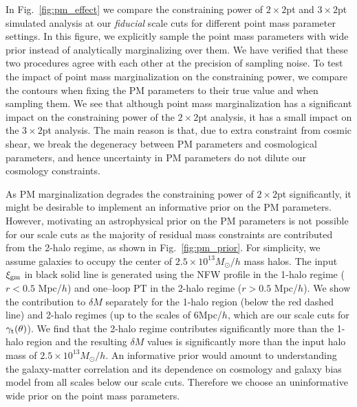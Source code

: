 \documentclass[aps, prd,twocolumn,superscriptaddress,nofootinbib,preprintnumbers]{revtex4-1}
\newcommand{\gammat}{\ensuremath{\gamma_{\rm t}(\theta)}}
\begin{document}
In Fig.~\ref{fig:pm_effect} we compare the constraining power of $2\times2$pt and $3\times2$pt simulated analysis at our \textit{fiducial} scale cuts for different point mass parameter settings. In this figure, we explicitly sample the point mass parameters with wide prior instead of analytically marginalizing over them. We have verified that these two procedures agree with each other at the precision of sampling noise. To test the impact of point mass marginalization on the constraining power, we compare the contours when fixing the PM parameters to their true value and when sampling them. We see that although point mass marginalization has a significant impact on the constraining power of the $2\times2$pt analysis, it has a small impact on the $3\times2$pt analysis. The main reason is that, due to extra constraint from cosmic shear, we break the degeneracy between PM parameters and cosmological parameters, and hence uncertainty in PM parameters do not dilute our cosmology constraints. 


As PM marginalization degrades the constraining power of $2\times2$pt significantly, it might be desirable to implement an informative prior on the PM parameters. However, motivating an astrophysical prior on the PM parameters is not possible for our scale cuts as the majority of residual mass constraints are contributed from the 2-halo regime, as shown in Fig.~\ref{fig:pm_prior}. For simplicity, we assume galaxies to occupy the center of $2.5 \times 10^{13} M_{\odot}/h$ mass halos. The input $\xi_{\rm gm}$ in black solid line is generated using the NFW profile in the 1-halo regime ($r < 0.5$ Mpc/$h$) and one--loop PT in the 2-halo regime ($r > 0.5$ Mpc/$h$). We show the contribution to $\delta M$ separately for the 1-halo region (below the red dashed line) and 2-halo regimes (up to the scales of 6Mpc/$h$, which are our scale cuts for $\gammat$). We find that the 2-halo regime contributes significantly more than the 1-halo region and the resulting $\delta M$ values is significantly more than the input halo mass of $2.5 \times 10^{13} M_{\odot}/h$. An informative prior would amount to understanding the galaxy-matter correlation and its dependence on cosmology and galaxy bias model from all scales below our scale cuts. Therefore we choose an uninformative wide prior on the point mass parameters. 
\end{document}
